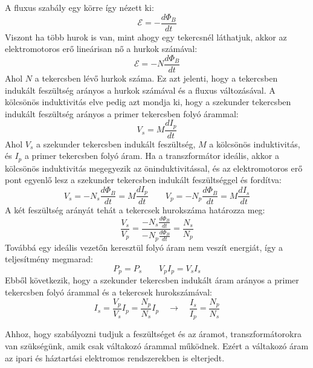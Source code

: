 \documentclass[../main.tex]{subfiles}
\begin{document}
A fluxus szabály egy körre így nézett ki:
\begin{equation}
    \mathcal{E} = - \frac{d\Phi_B}{dt}
\end{equation}
Viszont ha több hurok is van, mint ahogy egy tekercsnél láthatjuk, akkor az elektromotoros erő lineárisan nő a hurkok számával:
\begin{equation}
    \mathcal{E} = - N \frac{d\Phi_B}{dt}
\end{equation}
Ahol $N$ a tekercsben lévő hurkok száma. Ez azt jelenti, hogy a tekercsben indukált feszültség arányos a hurkok számával és a fluxus változásával. A kölcsönös induktivitás elve pedig azt mondja ki, hogy a szekunder tekercsben indukált feszültség arányos a primer tekercsben folyó árammal:
\begin{equation}
    V_s = M \frac{dI_p}{dt}
\end{equation}
Ahol $V_s$ a szekunder tekercsben indukált feszültség, $M$ a kölcsönös induktivitás, és $I_p$ a primer tekercsben folyó áram. Ha a transzformátor ideális, akkor a kölcsönös induktivitás megegyezik az öninduktivitással,
és az elektromotoros erő pont egyenlő lesz a szekunder tekercsben indukált feszültséggel és fordítva:
\begin{equation}
    V_s = - N_s \frac{d\Phi_B}{dt} = M \frac{dI_p}{dt} \qquad V_p = - N_p \frac{d\Phi_B}{dt} = M \frac{dI_s}{dt}
\end{equation}
A két feszültség arányát tehát a tekercsek hurokszáma határozza meg:
\begin{equation}
    \frac{V_s}{V_p} = \frac{- N_s \frac{d\Phi_B}{dt}}{- N_p \frac{d\Phi_B}{dt}} = \frac{N_s}{N_p}
\end{equation}
Továbbá egy ideális vezetőn keresztül folyó áram nem veszít energiát, így a teljesítmény megmarad:
\begin{equation}
    P_p = P_s \qquad V_p I_p = V_s I_s
\end{equation}
Ebből következik, hogy a szekunder tekercsben indukált áram arányos a primer tekercsben folyó árammal és a tekercsek hurokszámával:
\begin{equation}
    I_s = \frac{V_p}{V_s} I_p = \frac{N_p}{N_s} I_p \quad \to \quad \frac{I_s}{I_p} = \frac{N_p}{N_s}
\end{equation}

Ahhoz, hogy szabályozni tudjuk a feszültséget és az áramot, transzformátorokra van szükségünk, amik csak váltakozó árammal működnek. Ezért a váltakozó áram az ipari és háztartási elektromos rendszerekben is elterjedt.
\end{document}
